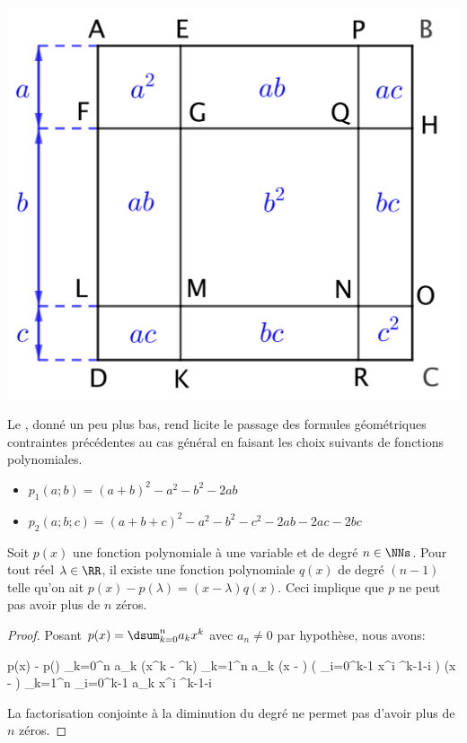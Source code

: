 \begin{center}
	\includegraphics[scale = .7]{(a+b)^3.png}
\end{center}

Le , donné un peu plus bas, rend licite le passage des formules géométriques contraintes précédentes au cas général en faisant les choix suivants de fonctions polynomiales.
%
\begin{itemize}[label=\small\textbullet]
	\item $p_1(a ; b) = (a + b)^2 - a^2 - b^2 - 2 ab$

	\item $p_2(a ; b ; c) = (a + b + c)^2 - a^2 - b^2 - c^2 - 2 ab - 2 ac - 2 bc$
\end{itemize}




\begin{preli} \label{poly-finite-zeros}
	Soit $p(x)$ une fonction polynomiale à une variable et de degré $n \in \NNs$.
	Pour tout réel $\lambda \in \RR$,
	il existe une fonction polynomiale $q(x)$ de degré $(n-1)$ telle qu'on ait 
	$p(x) - p(\lambda) = (x - \lambda) q(x)$.
	Ceci implique que $p$ ne peut pas avoir plus de $n$ zéros.
\end{preli}


\begin{proof}
	Posant $p(x) = \dsum_{k=0}^{n} a_k x^k$ avec $a_n \neq 0$ par hypothèse, nous avons:
	
	\begin{stepcalc}[style=sar]
	    p(x) - p(\lambda)
	\explnext{}
	    \dsum_{k=0}^{n} a_k (x^k - \lambda^k)
	\explnext{}
	    \dsum_{k=1}^{n} a_k (x - \lambda) \big( \dsum_{i=0}^{k-1} x^i \lambda^{k-1-i} \big)
	\explnext{}
	    (x - \lambda) \dsum_{k=1}^{n} \dsum_{i=0}^{k-1} a_k x^i \lambda^{k-1-i} 
	\end{stepcalc}
	
	La factorisation conjointe à la diminution du degré ne permet pas d'avoir plus de $n$ zéros. 
\end{proof}


